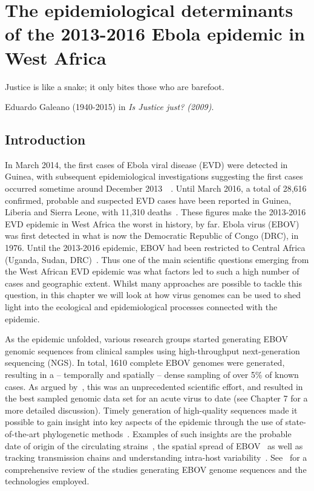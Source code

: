 \chapter{The epidemiological determinants of the 2013-2016 Ebola
epidemic in West Africa}
\epigraph{Justice is like a snake; it only bites those who are barefoot.}{Eduardo Galeano (1940-2015) in \textit{Is Justice just? (2009)}.}

\section{Introduction}

In March 2014, the first cases of Ebola viral disease (EVD) were detected in Guinea, with subsequent epidemiological investigations suggesting the first cases occurred sometime around December 2013~~\citep{Baize2014}.
Until March 2016, a total of 28,616 confirmed, probable and suspected EVD cases have been reported in Guinea, Liberia and Sierra Leone, with 11,310 deaths~\citep{WHO2016}.
These figures make the 2013-2016 EVD epidemic in West Africa the worst in history, by far.
Ebola virus (EBOV) was first detected in what is now the Democratic Republic of Congo (DRC), in 1976.
Until the 2013-2016 epidemic, EBOV had been restricted to Central Africa (Uganda, Sudan, DRC)~\citep{CDC2015}.
Thus one of the main scientific questions emerging from the West African EVD epidemic was what factors led to such a high number of cases and geographic extent.
Whilst many approaches are possible to tackle this question, in this chapter we will look at how virus genomes can be used to shed light into the ecological and epidemiological processes connected with the epidemic.

As the epidemic unfolded, various research groups started generating EBOV genomic sequences from clinical samples using high-throughput next-generation sequencing (NGS).
In total, 1610 complete EBOV genomes were generated, resulting in a -- temporally and spatially --  dense sampling of over 5\% of known cases.
As argued by~\cite{Holmes2016}, this was an unprecedented scientific effort, and resulted in the best sampled genomic data set for an acute virus to date (see Chapter 7 for a more detailed discussion).
Timely generation of high-quality sequences made it possible to gain insight into key aspects of the epidemic through the use of state-of-the-art phylogenetic methods~\citep{Dudas2014,Gire2014,Carroll2015,Park2015}.
Examples of such insights are the probable date of origin of the circulating strains~\citep{Gire2014, Park2015}, the spatial spread of EBOV~\citep{Carroll2015,Dudas2017} as well as tracking transmission chains and understanding intra-host variability~\citep{Park2015}.
See~\cite{Holmes2016} for a comprehensive review of the studies generating EBOV genome sequences and the technologies employed.


